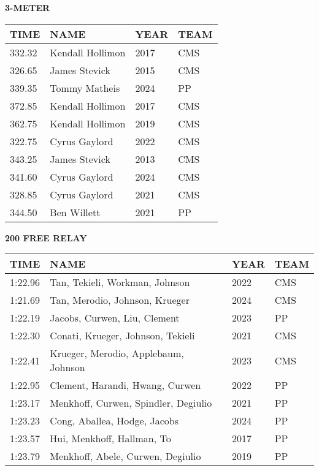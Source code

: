 \vspace{0.4cm}

\begin{center}
\begin{minipage}[t]{0.7\textwidth}
\centering
\textbf{3-METER}\\[0.05cm]
\begin{tabular}{@{}p{1.8cm}p{2.8cm}p{1.2cm}p{1.4cm}@{}}
\hline
\textbf{TIME} & \textbf{NAME} & \textbf{YEAR} & \textbf{TEAM} \\
\hline
332.32 & Kendall Hollimon & 2017 & CMS \\
326.65 & James Stevick & 2015 & CMS \\
339.35 & Tommy Matheis & 2024 & PP \\
372.85 & Kendall Hollimon & 2017 & CMS \\
362.75 & Kendall Hollimon & 2019 & CMS \\
322.75 & Cyrus Gaylord & 2022 & CMS \\
343.25 & James Stevick & 2013 & CMS \\
341.60 & Cyrus Gaylord & 2024 & CMS \\
328.85 & Cyrus Gaylord & 2021 & CMS \\
344.50 & Ben Willett & 2021 & PP \\
\hline
\end{tabular}
\end{minipage}
\end{center}

\vspace{0.4cm}

\begin{center}
\begin{minipage}[t]{0.7\textwidth}
\centering
\textbf{200 FREE RELAY}\\[0.05cm]
\begin{tabular}{@{}p{1.8cm}p{2.8cm}p{1.2cm}p{1.4cm}@{}}
\hline
\textbf{TIME} & \textbf{NAME} & \textbf{YEAR} & \textbf{TEAM} \\
\hline
1:22.96 & Tan, Tekieli, Workman, Johnson & 2022 & CMS \\
1:21.69 & Tan, Merodio, Johnson, Krueger & 2024 & CMS \\
1:22.19 & Jacobs, Curwen, Liu, Clement & 2023 & PP \\
1:22.30 & Conati, Krueger, Johnson, Tekieli & 2021 & CMS \\
1:22.41 & Krueger, Merodio, Applebaum, Johnson & 2023 & CMS \\
1:22.95 & Clement, Harandi, Hwang, Curwen & 2022 & PP \\
1:23.17 & Menkhoff, Curwen, Spindler, Degiulio & 2021 & PP \\
1:23.23 & Cong, Aballea, Hodge, Jacobs & 2024 & PP \\
1:23.57 & Hui, Menkhoff, Hallman, To & 2017 & PP \\
1:23.79 & Menkhoff, Abele, Curwen, Degiulio & 2019 & PP \\
\hline
\end{tabular}
\end{minipage}
\end{center}

